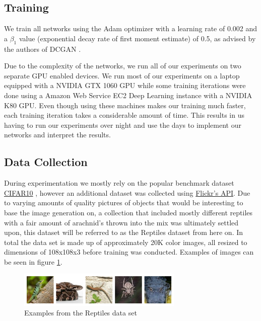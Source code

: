 \subsection{Training}
We train all networks using the Adam optimizer \cite{DBLP:journals/corr/KingmaB14} with a learning rate of 0.002 and a $\beta_1$ value (exponential decay rate of first moment estimate) of 0.5, as advised by the authors of DCGAN \cite{DBLP:journals/corr/RadfordMC15}.

Due to the complexity of the networks, we run all of our experiments on two separate GPU enabled devices. We run most of our experiments on a laptop equipped with a NVIDIA GTX 1060 GPU while some training iterations were done using a Amazon Web Service EC2 Deep Learning instance with a NVIDIA K80 GPU. Even though using these machines makes our training much faster, each training iteration takes a considerable amount of time. This results in us having to run our experiments over night and use the days to implement our networks and interpret the results. 

\subsection{Data Collection}

During experimentation we mostly rely on the popular benchmark dataset \href{https://www.cs.toronto.edu/~kriz/cifar.html}{CIFAR10} \cite{cifar10}, however an additional dataset was collected using \href{https://www.flickr.com/services/api/}{Flickr's API}. Due to varying amounts of quality pictures of objects that would be interesting to base the image generation on, a collection that included mostly different reptiles with a fair amount of arachnid's thrown into the mix was ultimately settled upon, this dataset will be referred to as the Reptiles dataset from here on. In total the data set is made up of approximately 20K color images, all resized to dimensions of 108x108x3 before training was conducted. Examples of images can be seen in figure \ref{fig:reptiles}.%
\begin{figure}[H]
\centering
\includegraphics[width=0.7\textwidth]{figures/reptiles.png}
\caption{Examples from the Reptiles data set}
\label{fig:reptiles}
\end{figure}